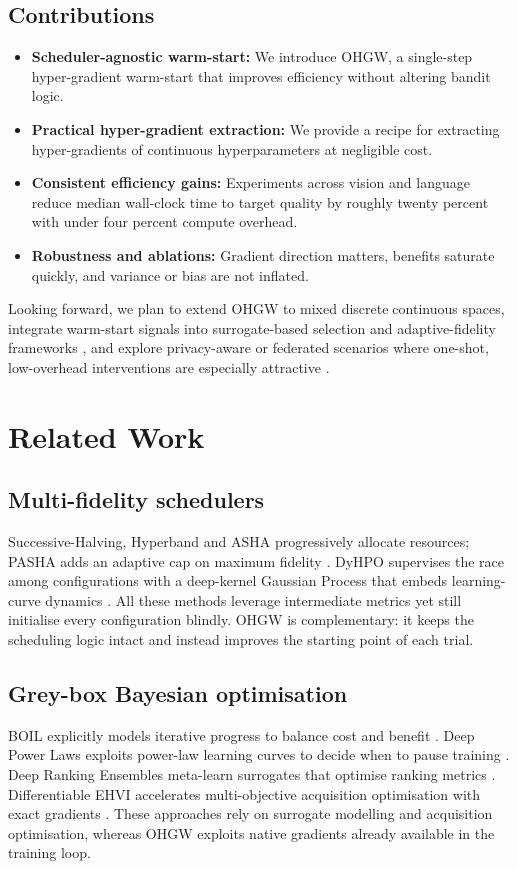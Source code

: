 \documentclass{article}
\begin{document}
\subsection{Contributions}
\begin{itemize}
    \item \textbf{Scheduler-agnostic warm-start:} We introduce OHGW, a single-step hyper-gradient warm-start that improves efficiency without altering bandit logic.
    \item \textbf{Practical hyper-gradient extraction:} We provide a recipe for extracting hyper-gradients of continuous hyperparameters at negligible cost.
    \item \textbf{Consistent efficiency gains:} Experiments across vision and language reduce median wall-clock time to target quality by roughly twenty percent with under four percent compute overhead.
    \item \textbf{Robustness and ablations:} Gradient direction matters, benefits saturate quickly, and variance or bias are not inflated.
\end{itemize}

Looking forward, we plan to extend OHGW to mixed discretecontinuous spaces, integrate warm-start signals into surrogate-based selection \cite{khazi-2023-deep} and adaptive-fidelity frameworks \cite{jiang-2024-efficient}, and explore privacy-aware or federated scenarios where one-shot, low-overhead interventions are especially attractive \cite{panda-2022-new,khodak-2021-federated}.

\section{Related Work}
\subsection{Multi-fidelity schedulers}
Successive-Halving, Hyperband and ASHA progressively allocate resources; PASHA adds an adaptive cap on maximum fidelity \cite{bohdal-2022-pasha}. DyHPO supervises the race among configurations with a deep-kernel Gaussian Process that embeds learning-curve dynamics \cite{wistuba-2022-supervising}. All these methods leverage intermediate metrics yet still initialise every configuration blindly. OHGW is complementary: it keeps the scheduling logic intact and instead improves the starting point of each trial.

\subsection{Grey-box Bayesian optimisation}
BOIL explicitly models iterative progress to balance cost and benefit \cite{nguyen-2019-bayesian}. Deep Power Laws exploits power-law learning curves to decide when to pause training \cite{kadra-2023-scaling}. Deep Ranking Ensembles meta-learn surrogates that optimise ranking metrics \cite{khazi-2023-deep}. Differentiable EHVI accelerates multi-objective acquisition optimisation with exact gradients \cite{daulton-2020-differentiable}. These approaches rely on surrogate modelling and acquisition optimisation, whereas OHGW exploits native gradients already available in the training loop.
\end{document}
